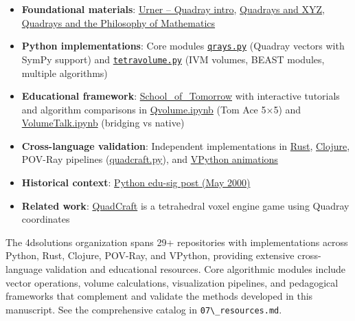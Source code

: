 \documentclass[
  10pt,
]{article}
\newcommand{\passthrough}[1]{#1}
\providecommand{\tightlist}{%
  \setlength{\itemsep}{0pt}\setlength{\parskip}{0pt}}
\begin{document}
\begin{itemize}
\tightlist
\item
  \textbf{Foundational materials}:
  \href{https://www.grunch.net/synergetics/quadintro.html}{Urner --
  Quadray intro},
  \href{https://www.grunch.net/synergetics/quadxyz.html}{Quadrays and
  XYZ}, \href{https://www.grunch.net/synergetics/quadphil.html}{Quadrays
  and the Philosophy of Mathematics}
\item
  \textbf{Python implementations}: Core modules
  \href{https://github.com/4dsolutions/m4w/blob/main/qrays.py}{\passthrough{\lstinline!qrays.py!}}
  (Quadray vectors with SymPy support) and
  \href{https://github.com/4dsolutions/m4w/blob/main/tetravolume.py}{\passthrough{\lstinline!tetravolume.py!}}
  (IVM volumes, BEAST modules, multiple algorithms)
\item
  \textbf{Educational framework}:
  \href{https://github.com/4dsolutions/School_of_Tomorrow}{School\_of\_Tomorrow}
  with interactive tutorials and algorithm comparisons in
  \href{https://github.com/4dsolutions/School_of_Tomorrow/blob/master/Qvolume.ipynb}{Qvolume.ipynb}
  (Tom Ace 5×5) and
  \href{https://github.com/4dsolutions/School_of_Tomorrow/blob/master/VolumeTalk.ipynb}{VolumeTalk.ipynb}
  (bridging vs native)
\item
  \textbf{Cross-language validation}: Independent implementations in
  \href{https://github.com/4dsolutions/rusty_rays}{Rust},
  \href{https://github.com/4dsolutions/synmods}{Clojure}, POV-Ray
  pipelines
  (\href{https://github.com/4dsolutions/School_of_Tomorrow/blob/master/quadcraft.py}{quadcraft.py}),
  and \href{https://github.com/4dsolutions/BookCovers}{VPython
  animations}
\item
  \textbf{Historical context}:
  \href{https://mail.python.org/pipermail/edu-sig/2000-May/000498.html}{Python
  edu-sig post (May 2000)}
\item
  \textbf{Related work}:
  \href{https://github.com/docxology/quadcraft/}{QuadCraft} is a
  tetrahedral voxel engine game using Quadray coordinates
\end{itemize}

The 4dsolutions organization spans 29+ repositories with implementations
across Python, Rust, Clojure, POV-Ray, and VPython, providing extensive
cross-language validation and educational resources. Core algorithmic
modules include vector operations, volume calculations, visualization
pipelines, and pedagogical frameworks that complement and validate the
methods developed in this manuscript. See the comprehensive catalog in
\passthrough{\lstinline!07\_resources.md!}.
\end{document}
